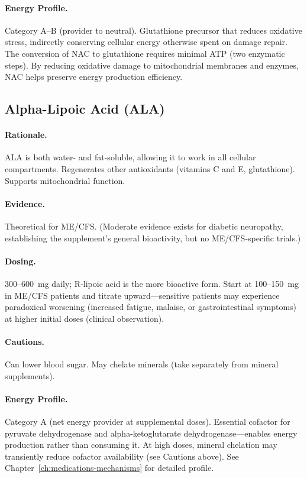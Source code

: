 \paragraph{Energy Profile.}
Category A--B (provider to neutral). Glutathione precursor that reduces oxidative stress, indirectly conserving cellular energy otherwise spent on damage repair. The conversion of NAC to glutathione requires minimal ATP (two enzymatic steps). By reducing oxidative damage to mitochondrial membranes and enzymes, NAC helps preserve energy production efficiency.

\subsection{Alpha-Lipoic Acid (ALA)}

\paragraph{Rationale.} ALA is both water- and fat-soluble, allowing it to work in all cellular compartments. Regenerates other antioxidants (vitamins C and E, glutathione). Supports mitochondrial function.

\paragraph{Evidence.} Theoretical for ME/CFS. (Moderate evidence exists for diabetic neuropathy, establishing the supplement's general bioactivity, but no ME/CFS-specific trials.)

\paragraph{Dosing.} 300--600~mg daily; R-lipoic acid is the more bioactive form. Start at 100--150~mg in ME/CFS patients and titrate upward---sensitive patients may experience paradoxical worsening (increased fatigue, malaise, or gastrointestinal symptoms) at higher initial doses (clinical observation).

\paragraph{Cautions.} Can lower blood sugar. May chelate minerals (take separately from mineral supplements).

\paragraph{Energy Profile.}
Category A (net energy provider at supplemental doses). Essential cofactor for pyruvate dehydrogenase and alpha-ketoglutarate dehydrogenase---enables energy production rather than consuming it. At high doses, mineral chelation may transiently reduce cofactor availability (see Cautions above). See Chapter~\ref{ch:medications-mechanisms} for detailed profile.

